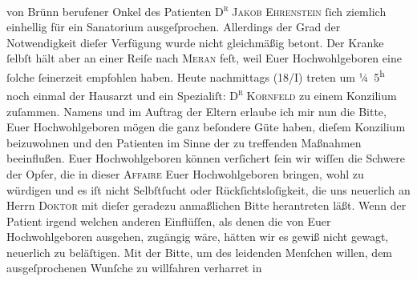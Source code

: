 \begin{ledgroupsized}[t]{13cm}
               von Brünn berufener Onkel des Patienten \textsc{D\textsuperscript{r}{ }Jakob Ehrenstein}{ }ſich ziemlich einhellig  für ein Sanatorium aus{\pb}geſprochen.
               Allerdings  der Grad der Notwendigkeit dieſer
               Verfügung wurde nicht gleichmäßig betont. Der Kranke ſelbſt hält aber an einer Reiſe
               nach \textsc{Meran} feſt, weil Euer Hochwohlgeboren eine ſolche ſeinerzeit empfohlen haben.\pend
           \pstart
           Heute{ }nachmittags (18/I) treten um ¼ 5\textsuperscript{h} noch einmal der Hausarzt und ein Spezialiſt: \textsc{D\textsuperscript{r}{ }Kornfeld} zu einem Konzilium zuſammen. Namens und im Auftrag der Eltern erlaube ich
               mir nun die Bitte, Euer Hochwohlgeboren mögen die ganz beſondere Güte haben, {\pb}dieſem Konzilium beizuwohnen und den Patienten im Sinne der zu treffenden
               Maßnahmen beeinflußen.\pend
           \pstart
           Euer Hochwohlgeboren können verſichert ſein wir wiſſen die Schwere der Opfer, die in
               dieser \textsc{Affaire} Euer Hochwohlgeboren bringen, wohl zu
               würdigen und es iſt nicht Selbſtſucht oder Rückſichtsloſigkeit, die uns neuerlich an
               Herrn \textsc{Doktor} mit dieſer geradezu anmaßlichen Bitte
               herantreten läßt. Wenn der Patient irgend welchen anderen Einflüſſen, als denen die von Euer
               Hochwohlgeboren ausgehen, zugängig wäre, hätten wir es gewiß nicht {\pb}gewagt, neuerlich zu beläſtigen.\pend
           \pstart
           Mit der Bitte, um des leidenden Menſchen willen, dem ausgeſprochenen Wunſche zu willfahren verharret in

\end{ledgroupsized}
